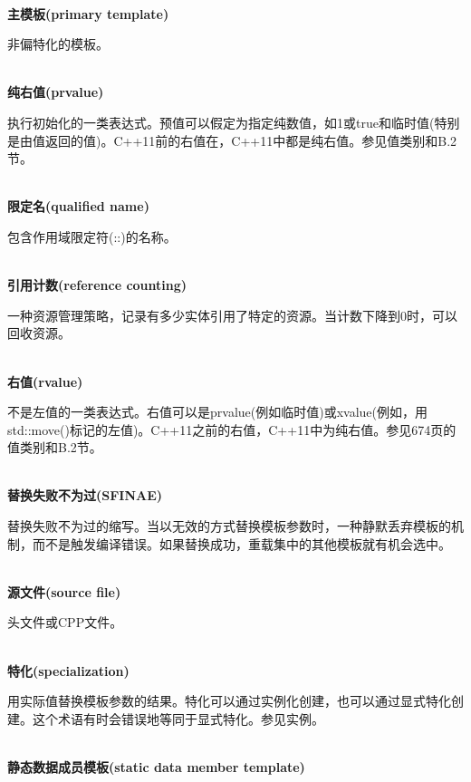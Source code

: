\hspace*{\fill} \\ %
\noindent
\textbf{主模板(primary template)}

非偏特化的模板。

\hspace*{\fill} \\ %
\noindent
\textbf{纯右值(prvalue)}

执行初始化的一类表达式。预值可以假定为指定纯数值，如1或true和临时值(特别是由值返回的值)。C++11前的右值在，C++11中都是纯右值。参见值类别和B.2节。

\hspace*{\fill} \\ %
\noindent
\textbf{限定名(qualified name)}

包含作用域限定符(::)的名称。

\hspace*{\fill} \\ %
\noindent
\textbf{引用计数(reference counting)}

一种资源管理策略，记录有多少实体引用了特定的资源。当计数下降到0时，可以回收资源。

\hspace*{\fill} \\ %
\noindent
\textbf{右值(rvalue)}

不是左值的一类表达式。右值可以是prvalue(例如临时值)或xvalue(例如，用std::move()标记的左值)。C++11之前的右值，C++11中为纯右值。参见674页的值类别和B.2节。

\hspace*{\fill} \\ %
\noindent
\textbf{替换失败不为过(SFINAE)}

替换失败不为过的缩写。当以无效的方式替换模板参数时，一种静默丢弃模板的机制，而不是触发编译错误。如果替换成功，重载集中的其他模板就有机会选中。

\hspace*{\fill} \\ %
\noindent
\textbf{源文件(source file)}

头文件或CPP文件。

\hspace*{\fill} \\ %
\noindent
\textbf{特化(specialization)}

用实际值替换模板参数的结果。特化可以通过实例化创建，也可以通过显式特化创建。这个术语有时会错误地等同于显式特化。参见实例。

\hspace*{\fill} \\ %
\noindent
\textbf{静态数据成员模板(static data member template)}

